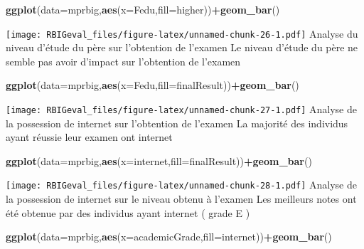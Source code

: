 \documentclass[
]{article}
\newenvironment{Shaded}{\begin{snugshade}}{\end{snugshade}}
\newcommand{\DataTypeTok}[1]{\textcolor[rgb]{0.13,0.29,0.53}{#1}}
\newcommand{\KeywordTok}[1]{\textcolor[rgb]{0.13,0.29,0.53}{\textbf{#1}}}
\newcommand{\NormalTok}[1]{#1}
\newcommand{\OperatorTok}[1]{\textcolor[rgb]{0.81,0.36,0.00}{\textbf{#1}}}
\begin{document}
\begin{Shaded}
\begin{Highlighting}[]
\KeywordTok{ggplot}\NormalTok{(}\DataTypeTok{data=}\NormalTok{mprbig,}\KeywordTok{aes}\NormalTok{(}\DataTypeTok{x=}\NormalTok{Fedu,}\DataTypeTok{fill=}\NormalTok{higher))}\OperatorTok{+}\KeywordTok{geom_bar}\NormalTok{()}
\end{Highlighting}
\end{Shaded}

\texttt{[image: RBIGeval\_files/figure-latex/unnamed-chunk-26-1.pdf]}
Analyse du niveau d'étude du père sur l'obtention de l'examen Le niveau
d'étude du père ne semble pas avoir d'impact sur l'obtention de l'examen

\begin{Shaded}
\begin{Highlighting}[]
\KeywordTok{ggplot}\NormalTok{(}\DataTypeTok{data=}\NormalTok{mprbig,}\KeywordTok{aes}\NormalTok{(}\DataTypeTok{x=}\NormalTok{Fedu,}\DataTypeTok{fill=}\NormalTok{finalResult))}\OperatorTok{+}\KeywordTok{geom_bar}\NormalTok{()}
\end{Highlighting}
\end{Shaded}

\texttt{[image: RBIGeval\_files/figure-latex/unnamed-chunk-27-1.pdf]}
Analyse de la possession de internet sur l'obtention de l'examen La
majorité des individus ayant réussie leur examen ont internet

\begin{Shaded}
\begin{Highlighting}[]
\KeywordTok{ggplot}\NormalTok{(}\DataTypeTok{data=}\NormalTok{mprbig,}\KeywordTok{aes}\NormalTok{(}\DataTypeTok{x=}\NormalTok{internet,}\DataTypeTok{fill=}\NormalTok{finalResult))}\OperatorTok{+}\KeywordTok{geom_bar}\NormalTok{()}
\end{Highlighting}
\end{Shaded}

\texttt{[image: RBIGeval\_files/figure-latex/unnamed-chunk-28-1.pdf]}
Analyse de la possession de internet sur le niveau obtenu à l'examen Les
meilleurs notes ont été obtenue par des individus ayant internet ( grade
E )

\begin{Shaded}
\begin{Highlighting}[]
\KeywordTok{ggplot}\NormalTok{(}\DataTypeTok{data=}\NormalTok{mprbig,}\KeywordTok{aes}\NormalTok{(}\DataTypeTok{x=}\NormalTok{academicGrade,}\DataTypeTok{fill=}\NormalTok{internet))}\OperatorTok{+}\KeywordTok{geom_bar}\NormalTok{()}
\end{Highlighting}
\end{Shaded}
\end{document}
